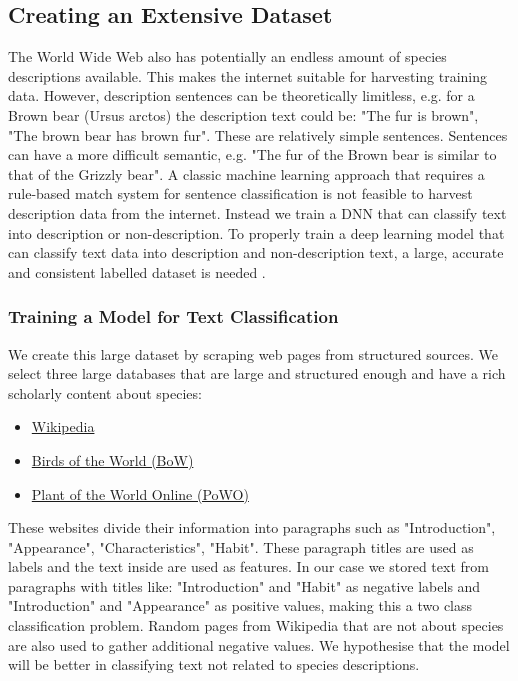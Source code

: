 \documentclass[a4paper, 12pt, oneside]{book} %
\begin{document}
\subsection{Creating an Extensive Dataset} \label{par:dataset}
The World Wide Web also has potentially an endless amount of species descriptions available.
This makes the internet suitable for harvesting training data.
However, description sentences can be theoretically limitless, e.g. for a Brown bear (Ursus arctos) the description text could be: "The fur is brown", "The brown bear has brown fur".
These are relatively simple sentences.
Sentences can have a more difficult semantic, e.g. "The fur of the Brown bear is similar to that of the Grizzly bear".
A classic machine learning approach that requires a rule-based match system for sentence classification is not feasible to harvest description data from the internet.
Instead we train a DNN that can classify text into description or non-description.
To properly train a deep learning model that can classify text data into description and non-description text, a large, accurate and consistent labelled dataset is needed \autocite{munappy_data_2019}.

\subsubsection{Training a Model for Text Classification} \label{par:reedloss}
We create this large dataset by scraping web pages from structured sources.
We select three large databases that are large and structured enough and have a rich scholarly content about species:
\begin{itemize}
    \item \href{www.wikipedia.com}{Wikipedia}
    \item \href{https://birdsoftheworld.org/bow/home}{Birds of the World (BoW)}
    \item \href{https://powo.science.kew.org/}{Plant of the World Online (PoWO)}
\end{itemize}

These websites divide their information into paragraphs such as "Introduction", "Appearance", "Characteristics", "Habit".
These paragraph titles are used as labels and the text inside are used as features.
In our case we stored text from paragraphs with titles like:  "Introduction" and "Habit" as negative labels and "Introduction" and "Appearance" as positive values, making this a two class classification problem. 
Random pages from Wikipedia that are not about species are also used to gather additional negative values.
We hypothesise that the model will be better in classifying text not related to species descriptions.
\end{document}
